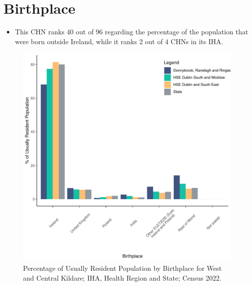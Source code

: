 \documentclass{article}
\begin{document}
\section{Birthplace}\label{sect:Birth}
\begin{itemize}
\item This CHN ranks  40 out of 96 regarding the percentage of the population that were born outside Ireland, while it ranks  2 out of 4 CHNs in its IHA.
\end{itemize}
\begin{figure}[H]
	\centering
	\includegraphics[width = 130mm]{../figures/BirthED.pdf}
	\caption{Percentage of Usually Resident Population by Birthplace for West and Central Kildare; IHA, Health Region and State; Census 2022.}
	\label{fig:vbnv}
	\end{figure}
	
\end{document}
